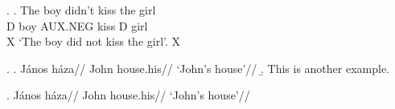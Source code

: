 \documentclass[12pt,letterpaper]{article}
\begin{document}
\ex. \ag. The boy didn't kiss the girl \\
D boy AUX.NEG kiss D girl \\  \hfill {\small\checkmark X}
\trans `The boy did not kiss the girl'. \hfill {\small\checkmark X}

\ex.
\a.
	\begingl
    \gla{}J\'anos h\'aza//
    \glb{}John house.his//
    \glft `John's house'//
    \endgl
\b. This is another example.

\ex.\begingl
    \gla{}J\'anos h\'aza//
    \glb{}John house.his//
    \glft `John's house'//
    \endgl
\end{document}
